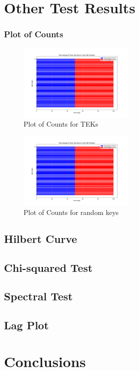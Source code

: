 \section{Other Test Results}

\subsubsection{Plot of Counts}
\begin{figure}[h]
\caption{Plot of Counts for TEKs}
\centering
\includegraphics[width=0.5\textwidth]{final0s1sboth.png}
\end{figure}

\begin{figure}[h]
\caption{Plot of Counts for random keys}
\centering
\includegraphics[width=0.5\textwidth]{final0s1sboth.png}
\end{figure}

\subsection{Hilbert Curve}

\subsection{Chi-squared Test}

\subsection{Spectral Test}

\subsection{Lag Plot}
\section{Conclusions}